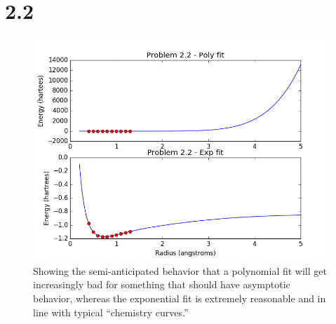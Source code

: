 \documentclass{article}
\begin{document}
\section{2.2}
\begin{figure}[h]
\begin{center}
\includegraphics[scale=0.75]{ex2.2/2_2.png}
\caption{Showing the semi-anticipated behavior that a polynomial fit will get increasingly bad for something that should have asymptotic behavior, whereas the exponential fit is extremely reasonable and in line with typical
``chemistry curves.''}
\end{center}
\end{figure}
\end{document}
